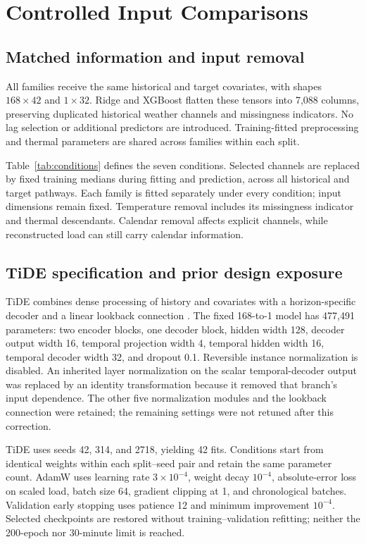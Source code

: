 \documentclass[conference]{IEEEtran}
\begin{document}
\section{Controlled Input Comparisons}
\subsection{Matched information and input removal}
All families receive the same historical and target covariates, with shapes $168\times42$ and $1\times32$. Ridge and XGBoost flatten these tensors into 7,088 columns, preserving duplicated historical weather channels and missingness indicators. No lag selection or additional predictors are introduced. Training-fitted preprocessing and thermal parameters are shared across families within each split.

Table~\ref{tab:conditions} defines the seven conditions. Selected channels are replaced by fixed training medians during fitting and prediction, across all historical and target pathways. Each family is fitted separately under every condition; input dimensions remain fixed. Temperature removal includes its missingness indicator and thermal descendants. Calendar removal affects explicit channels, while reconstructed load can still carry calendar information.



\subsection{TiDE specification and prior design exposure}
\label{sec:model}
TiDE combines dense processing of history and covariates with a horizon-specific decoder and a linear lookback connection \cite{das2023}. The fixed 168-to-1 model has 477,491 parameters: two encoder blocks, one decoder block, hidden width 128, decoder output width 16, temporal projection width 4, temporal hidden width 16, temporal decoder width 32, and dropout 0.1. Reversible instance normalization is disabled. An inherited layer normalization on the scalar temporal-decoder output was replaced by an identity transformation because it removed that branch's input dependence. The other five normalization modules and the lookback connection were retained; the remaining settings were not retuned after this correction.

TiDE uses seeds 42, 314, and 2718, yielding 42 fits. Conditions start from identical weights within each split--seed pair and retain the same parameter count. AdamW uses learning rate $3\times10^{-4}$, weight decay $10^{-4}$, absolute-error loss on scaled load, batch size 64, gradient clipping at 1, and chronological batches. Validation early stopping uses patience 12 and minimum improvement $10^{-4}$. Selected checkpoints are restored without training--validation refitting; neither the 200-epoch nor 30-minute limit is reached.
\end{document}
